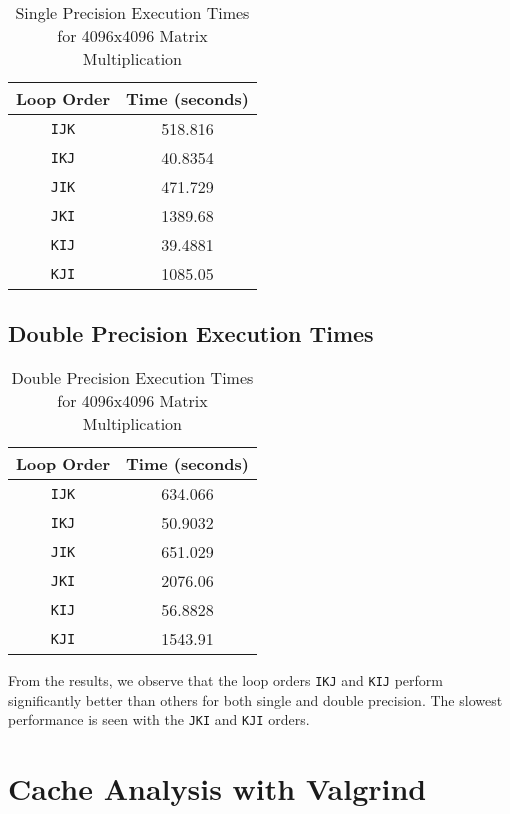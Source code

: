 \documentclass[12pt]{article}
\begin{document}
\begin{table}[H]
    \centering
    \begin{tabular}{|c|c|}
        \hline
        Loop Order & Time (seconds) \\
        \hline
        \texttt{IJK} & 518.816 \\
        \texttt{IKJ} & 40.8354 \\
        \texttt{JIK} & 471.729 \\
        \texttt{JKI} & 1389.68 \\
        \texttt{KIJ} & 39.4881 \\
        \texttt{KJI} & 1085.05 \\
        \hline
    \end{tabular}
    \caption{Single Precision Execution Times for 4096x4096 Matrix Multiplication}
\end{table}

\subsection{Double Precision Execution Times}

\begin{table}[H]
    \centering
    \begin{tabular}{|c|c|}
        \hline
        Loop Order & Time (seconds) \\
        \hline
        \texttt{IJK} & 634.066 \\
        \texttt{IKJ} & 50.9032 \\
        \texttt{JIK} & 651.029 \\
        \texttt{JKI} & 2076.06 \\
        \texttt{KIJ} & 56.8828 \\
        \texttt{KJI} & 1543.91 \\
        \hline
    \end{tabular}
    \caption{Double Precision Execution Times for 4096x4096 Matrix Multiplication}
\end{table}

From the results, we observe that the loop orders \texttt{IKJ} and \texttt{KIJ} perform significantly better than others for both single and double precision. The slowest performance is seen with the \texttt{JKI} and \texttt{KJI} orders.

\section{Cache Analysis with Valgrind}
\end{document}
